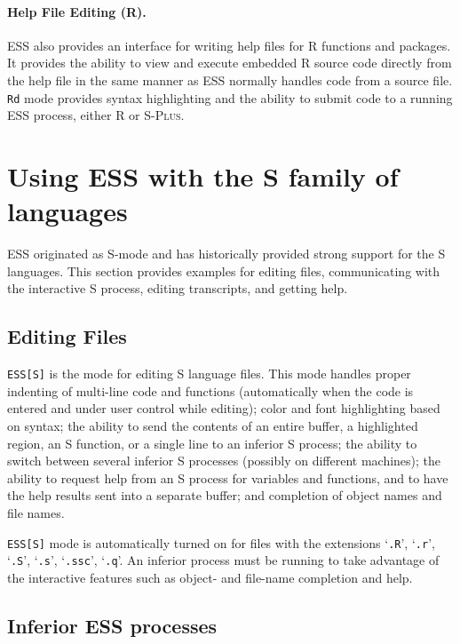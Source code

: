 \documentclass{article}
\newcommand*{\Splus}{\textsc{S-Plus}}
\newcommand{\stexttt}[1]{{\small\texttt{#1}}}
\newcommand{\file}[1]{`\stexttt{#1}'}
\begin{document}
\paragraph{Help File Editing (R).}
ESS also provides an interface for writing help files for R functions
and packages.  It provides the ability to view and execute embedded R
source code directly from the help file in the same manner as ESS
normally handles code from a source file.  \stexttt{Rd} mode provides
syntax highlighting and the ability to submit code to a running ESS
process, either R or \Splus.

\section{Using ESS with the S family of languages}
\label{sec:S}

ESS originated as S-mode and has historically provided strong support
for the S languages.  This section provides examples for editing
files, communicating with the interactive S process, editing
transcripts, and getting help.

\subsection{Editing Files}
\label{sec:S:edit}

\stexttt{ESS[S]} is the mode for editing S language files.  This mode
handles proper indenting of multi-line code and functions
(automatically when the code is entered and under user control while
editing); color and font highlighting based on syntax; the ability to
send the contents of an entire buffer, a highlighted region, an S
function, or a single line to an inferior S process; the ability to
switch between several inferior S processes (possibly on different
machines); the ability to request help from an S process for variables
and functions, and to have the help results sent into a separate
buffer; and completion of object names and file names.

\stexttt{ESS[S]} mode is automatically turned on for files with the
extensions \file{.R}, \file{.r}, \file{.S}, \file{.s}, \file{.ssc},
\file{.q}.  An inferior process must be running to take advantage of
the interactive features such as object- and file-name completion and
help.

\subsection{Inferior ESS processes}
\label{sec:S:inf}
\end{document}
